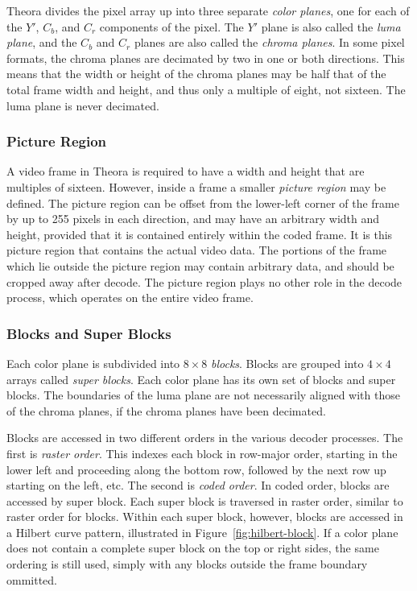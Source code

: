 \documentclass[11pt,letterpaper]{article}
\newcommand{\term}[1]{{\em #1}}
\begin{document}
Theora divides the pixel array up into three separate \term{color planes}, one
 for each of the $Y'$, $C_b$, and $C_r$ components of the pixel.
The $Y'$ plane is also called the \term{luma plane}, and the $C_b$ and $C_r$
 planes are also called the \term{chroma planes}.
In some pixel formats, the chroma planes are decimated by two in one or both
 directions.
This means that the width or height of the chroma planes may be half that of
 the total frame width and height, and thus only a multiple of eight, not
 sixteen.
The luma plane is never decimated.

\subsubsection{Picture Region}

A video frame in Theora is required to have a width and height that are
 multiples of sixteen.
However, inside a frame a smaller \term{picture region} may be defined.
The picture region can be offset from the lower-left corner of the frame by up
 to 255 pixels in each direction, and may have an arbitrary width and height,
 provided that it is contained entirely within the coded frame.
It is this picture region that contains the actual video data.
The portions of the frame which lie outside the picture region may contain
 arbitrary data, and should be cropped away after decode.
The picture region plays no other role in the decode process, which operates on
 the entire video frame.

\subsubsection{Blocks and Super Blocks}

Each color plane is subdivided into $8\times 8$ \term{blocks}.
Blocks are grouped into $4\times 4$ arrays called \term{super blocks}.
Each color plane has its own set of blocks and super blocks.
The boundaries of the luma plane are not necessarily aligned with those of the
 chroma planes, if the chroma planes have been decimated.

Blocks are accessed in two different orders in the various decoder processes.
The first is \term{raster order}.
This indexes each block in row-major order, starting in the lower left and
 proceeding along the bottom row, followed by the next row up starting on the
 left, etc.
The second is \term{coded order}.
In coded order, blocks are accessed by super block.
Each super block is traversed in raster order, similar to raster order for
 blocks.
Within each super block, however, blocks are accessed in a Hilbert curve
 pattern, illustrated in Figure~\ref{fig:hilbert-block}.
If a color plane does not contain a complete super block on the top or right
 sides, the same ordering is still used, simply with any blocks outside the
 frame boundary ommitted.
\end{document}
